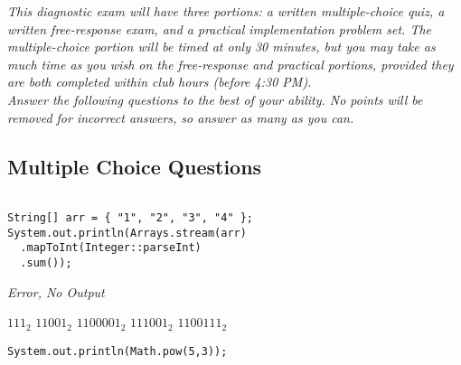 \documentclass[11pt,addpoints]{exam}
\begin{document}
\noindent
\textit{This diagnostic exam will have three portions: a written multiple-choice quiz, a written free-response exam, and a practical implementation problem set. The multiple-choice portion will be timed at only 30 minutes, but you may take as much time as you wish on the free-response and practical portions, provided they are both completed within club hours (before 4:30 PM).} \\

\noindent
\textit{Answer the following questions to the best of your ability. No points will be removed for incorrect answers, so answer as many as you can.}

\begin{questions} %

\section{Multiple Choice Questions}



\question[1]{}

\begin{verbatim}

String[] arr = { "1", "2", "3", "4" };
System.out.println(Arrays.stream(arr)
  .mapToInt(Integer::parseInt)
  .sum());
\end{verbatim}

\begin{choices}
  \choice \textit{Error, No Output}
\end{choices}


\begin{choices}
  \choice $111_{2}$
  \choice $11001_{2}$
  \choice $1100001_{2}$
  \choice $111001_{2}$
  \choice $1100111_{2}$
\end{choices}

\question[1]{}

\begin{verbatim}
System.out.println(Math.pow(5,3));
\end{verbatim}


\end{questions}
\end{document}
